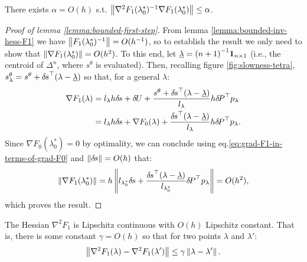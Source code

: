 \documentclass[smallcondensed]{svjour3}
\begin{document}
\begin{lemma}\label{lemma:bounded-first-step}
  There exists $\alpha = O(h)$ s.t.
  $\left\|\nabla^2 F_1(\lambda_{0}^*)^{-1} \nabla F_1(\lambda_{0}^*)\right\|
  \leq \alpha$.
\end{lemma}

\begin{proof}[Proof of lemma \ref{lemma:bounded-first-step}]
  From lemma \ref{lemma:bounded-inv-hess-F1} we have
  $\left\|F_1(\lambda_0^*)^{-1}\right\| = O(h^{-1})$, so to establish the
  result we only need to show that
  $\left\|\nabla F_1(\lambda_0^*)\right\| = O(h^2)$. To this end, let
  $\underline{\lambda} = {(n + 1)}^{-1} \boldsymbol{1}_{n \times 1}$ (i.e., the
  centroid of $\Delta^n$, where $s^\theta$ is evaluated). Then,
  recalling figure \ref{fig:slowness-tetra},
  $s^\theta_\lambda = s^\theta + {\delta \hspace{-0.1em} s}^\top (\lambda -
  \underline{\lambda})$ so that, for a general $\lambda$:
  \begin{equation}\label{eq:grad-F1-in-terms-of-grad-F0}
    \begin{aligned}
      \nabla F_1(\lambda) &= l_\lambda h {\delta \hspace{-0.1em} s} + {\delta \hspace{-0.09em} U} + \frac{s^\theta + {\delta \hspace{-0.1em} s}^\top (\lambda - \underline{\lambda})}{l_\lambda} h {\delta \hspace{-0.14em} P}^\top p_\lambda \\
      &= l_\lambda h {\delta \hspace{-0.1em} s} + \nabla F_0(\lambda) + \frac{{\delta \hspace{-0.1em} s}^\top {(\lambda - \underline{\lambda})}}{l_\lambda} h {\delta \hspace{-0.14em} P}^\top p_\lambda.
    \end{aligned}
  \end{equation}
  Since $\nabla F_0(\lambda_0^*) = 0$ by optimality, we can conclude
  using eq.\@ \ref{eq:grad-F1-in-terms-of-grad-F0} and
  $\left\|{\delta \hspace{-0.1em} s}\right\| = O(h)$ that:
  \begin{equation}
    \left\|\nabla F_1(\lambda_0^*)\right\| = h \left\|l_{\lambda_0^*} {\delta \hspace{-0.1em} s} + \frac{{\delta \hspace{-0.1em} s}^\top {(\lambda - \underline{\lambda})}}{l_{\lambda_0^*}} {\delta \hspace{-0.14em} P}^\top p_\lambda\right\| = O(h^2),
  \end{equation}
  which proves the result.
\end{proof}

\begin{lemma}\label{lemma:hess-F1-lipschitz}
  The Hessian $\nabla^2 F_1$ is Lipschitz continuous with $O(h)$
  Lipschitz constant. That is, there is some constant $\gamma = O(h)$
  so that for two points $\lambda$ and $\lambda'$:
  \begin{align*}
    \left\|\nabla^2 F_1(\lambda) - \nabla^2 F_1(\lambda')\right\| \leq \gamma \left\|\lambda - \lambda'\right\|.
  \end{align*}
\end{lemma}
\end{document}

